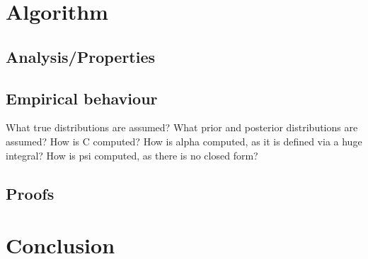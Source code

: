 \chapter{Algorithm}
\section{Analysis/Properties}
\section{Empirical behaviour}
What true distributions are assumed?
What prior and posterior distributions are assumed?
How is C computed?
How is alpha computed, as it is defined via a huge integral?
How is psi computed, as there is no closed form?
\section{Proofs}

\chapter{Conclusion}

